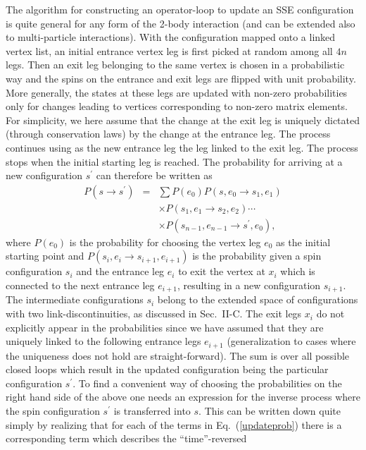 \documentclass[10pt,pre,aps,twocolumn,showpacs,superscriptaddress,
floatfix]{revtex4}
\newcommand{\bea}{\begin{eqnarray}}
\newcommand{\eea}{\end{eqnarray}}
\begin{document}
The algorithm for constructing an operator-loop to update an SSE 
configuration is quite general for any form of the 2-body interaction
(and can be extended also to multi-particle interactions). With the
configuration mapped onto a linked vertex list, an initial entrance 
vertex leg is first picked at random among all $4n$ legs. Then
an exit leg belonging to the same vertex is chosen in a probabilistic way 
and the spins on the entrance and exit legs are flipped with unit 
probability. More generally, the states at these legs are updated with
non-zero probabilities only for changes leading to vertices corresponding
to non-zero matrix elements. For simplicity, we here assume that the
change at the exit leg is uniquely dictated (through conservation laws) by 
the change at the entrance leg. The process continues using as the new 
entrance leg the leg linked to the exit leg. The process stops when the 
initial starting leg is reached. The probability for arriving at a new 
configuration $s^\prime$ can therefore be written as
\bea
	P(s \to s^\prime) & = & \sum P(e_0) P(s,e_0 \to s_1,e_1) 
	\nonumber \\ 
                    	  &   & \times P(s_1,e_1 \to s_2,e_2)
	                        \cdots \label{updateprob} \\
	                  &   & \times P(s_{n-1},e_{n-1} \to s^\prime,e_0),
	\nonumber
\eea
where $P(e_0)$ is the probability for choosing the vertex leg $e_0$ as
the initial starting point and $P(s_i,e_i \to s_{i+1},e_{i+1})$ is
the probability given a spin configuration $s_i$ and the entrance leg
$e_i$ to exit the vertex at $x_i$ which is connected to the next entrance
leg $e_{i+1}$, resulting in a new configuration $s_{i+1}$. The intermediate
configurations $s_i$ belong to the extended space of configurations with
two link-discontinuities, as discussed in Sec.~II-C. The exit legs $x_i$
do not explicitly appear in the probabilities since we have assumed that 
they are uniquely linked to the following entrance legs $e_{i+1}$ 
(generalization to cases where the uniqueness does not hold are 
straight-forward). The sum is over all possible closed 
loops which result in the updated configuration being the particular 
configuration $s^\prime$. To find a convenient way of choosing the 
probabilities on the right hand side of the above one needs an
expression for the inverse process where the spin configuration 
$s^\prime$ is transferred into $s$. This can be written down quite simply 
by realizing that for each of the terms in Eq.~(\ref{updateprob}) 
there is a corresponding term which describes the ``time''-reversed 
\end{document}
